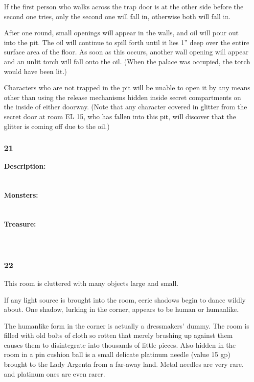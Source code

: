\documentclass[palace_of_the_silver_princess]{subfiles}
\begin{document}
If the first person who walks across the trap door is at the other side
before the second one tries, only the second one will fall in, otherwise
both will fall in.

After one round, small openings will appear in the walls, and
oil will pour out into the pit. The oil will continue to spill forth
until it lies 1” deep over the entire surface area of the floor. As
soon as this occurs, another wall opening will appear and an unlit torch
will fall onto the oil. (When the palace was occupied, the torch would
have been lit.)

Characters who are not trapped in the pit will be unable to open it by
any means other than using the release mechanisms hidden inside secret
compartments on the inside of either doorway. (Note that any character
covered in glitter from the secret door at room EL 15, who has fallen
into this pit, will discover that the glitter is coming off due to the
oil.)

\subsubsection{21}
\textbf{Description:}
\\
\\
\\
\textbf{Monsters:}
\\
\\
\\
\textbf{Treasure:}
\\
\\
\\

\subsubsection{22}
\begin{quotebox}
    This room is cluttered with many objects large and small.
\end{quotebox}

If any light source is brought into the room, eerie shadows begin to
dance wildly about. One shadow, lurking in the corner, appears to be
human or humanlike.

The humanlike form in the corner is actually a dressmakers’ dummy. The
room is filled with old bolts of cloth so rotten that merely brushing up
against them causes them to disintegrate into thousands of little
pieces. Also hidden in the room in a pin cushion ball is a small
delicate platinum needle (value 15 gp) brought to the Lady Argenta from
a far-away land. Metal needles are very rare, and platinum ones are
even rarer.
\end{document}
